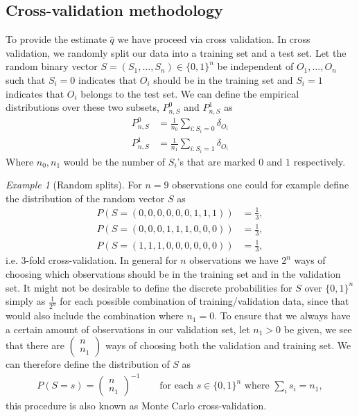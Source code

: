 \documentclass[11pt, a4paper]{article}
\theoremstyle{definition}
\theoremstyle{remark}
\newtheorem{example}{Example}
\newcommand{\q}{q}
\begin{document}
\subsection{Cross-validation methodology}
To provide the estimate $ \hat{\q} $ we have proceed via cross validation. In cross validation, we randomly split our data into a training set and a test set. Let the random binary vector $ S = (S_1,\ldots,S_n) \in \{0,1\}^{n} $ be independent of $ O_1,\ldots, O_n $ such that $ S_i = 0 $ indicates that $ O_i $ should be in the training set and $ S_i = 1 $ indicates that $ O_i $ belongs to the test set. We can define the empirical distributions over these two subsets, $ P_{n,S}^0$ and $ P_{n,S}^{1} $ as
\begin{align*}
    P_{n,S}^{0} &= \frac{1}{n_0} \sum_{i: S_i = 0} \delta_{O_i} \\
    P_{n,S}^{1} &= \frac{1}{n_1} \sum_{i: S_i = 1} \delta_{O_i} 
\end{align*}
Where $ n_0, n_1 $ would be the number of $ S_i $'s that are marked $ 0 $ and $ 1 $ respectively. 

\begin{example}[Random splits] \label{splits}
    For $ n = 9 $ observations one could for example define the distribution of the random vector $ S $ as 
   \begin{align*}
       P(S = (0, 0, 0, 0, 0, 0, 1, 1, 1)) &= \frac{1}{3}, \\
       P(S = (0, 0, 0, 1, 1, 1, 0, 0, 0)) &= \frac{1}{3}, \\
       P(S = (1, 1, 1, 0, 0, 0, 0, 0, 0)) &= \frac{1}{3},
   \end{align*}
    i.e. 3-fold cross-validation.
    In general for $ n $ observations we have $ 2^{n} $ ways of choosing which observations should be in the training set and in the validation set. It might not be desirable to define the discrete probabilities for $ S $ over $ \{0,1\}^{n} $ simply as $ \frac{1}{2^{n}} $ for each possible combination of training/validation data, since that would also include the combination where $ n_1 = 0 $. To ensure that we always have a certain amount of observations in our validation set, let $ n_1 > 0 $ be given, we see that there are $ \begin{pmatrix}
        n \\ n_1
    \end{pmatrix}$ ways of choosing both the validation and training set. We can therefore define the distribution of $ S $ as 
    \begin{align*}
        P \left(S = s \right) = \begin{pmatrix}
            n \\ n_1
    \end{pmatrix}^{-1} \qquad \text{for each } s \in \{0,1\}^{n} \text{ where } \sum_{i} s_i = n_1,
    \end{align*}
    this procedure is also known as Monte Carlo cross-validation.
\end{example}
\end{document}
